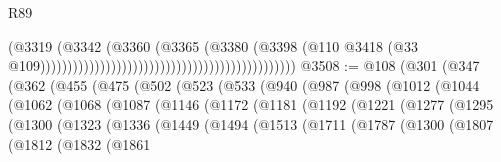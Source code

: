 \begin{lexlean}{R89}
\begin{coremodule}
                                                                                  (@3319
                                                                                    (@3342
                                                                                      (@3360
                                                                                        (@3365
                                                                                          (@3380
                                                                                            (@3398
                                                                                              (@110
                                                                                                @3418
                                                                                                (@33
                                                                                                  @109)))))))))))))))))))))))))))))))))))))))))))))))
@3508 := @108
    (@301
      (@347
        (@362
          (@455
            (@475
              (@502
                (@523
                  (@533
                    (@940
                      (@987
                        (@998
                          (@1012
                            (@1044
                              (@1062
                                (@1068
                                  (@1087
                                    (@1146
                                      (@1172
                                        (@1181
                                          (@1192
                                            (@1221
                                              (@1277
                                                (@1295
                                                  (@1300
                                                    (@1323
                                                      (@1336
                                                        (@1449
                                                          (@1494
                                                            (@1513
                                                              (@1711
                                                                (@1787
                                                                  (@1300
                                                                    (@1807
                                                                      (@1812
                                                                        (@1832
                                                                          (@1861

\end{coremodule}
\end{lexlean}
